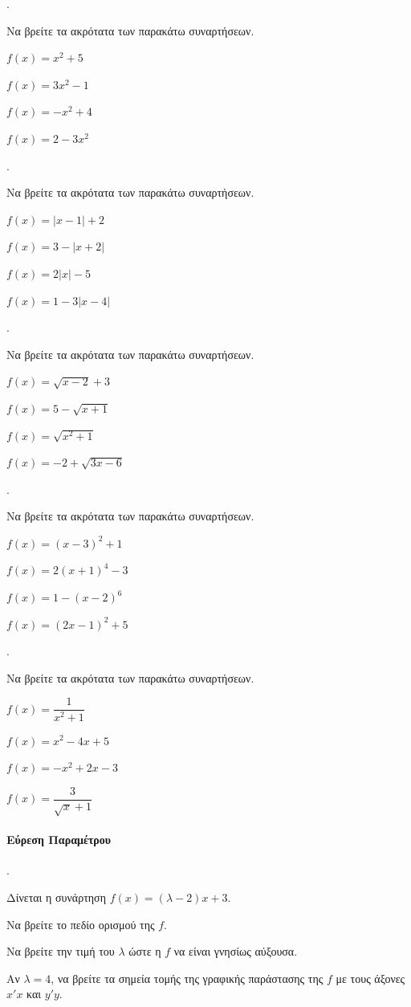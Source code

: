 \documentclass[11pt,a4paper,twocolumn]{article}
\newcounter{askhsh}
\newcommand{\askhsh}{\large\theaskhsh.\ \addtocounter{askhsh}{1}}
\begin{document}
\askhsh Να βρείτε τα ακρότατα των παρακάτω συναρτήσεων.
\begin{alist}
    \item $f(x)=x^2+5$
    \item $f(x)=3x^2-1$
    \item $f(x)=-x^2+4$
    \item $f(x)=2-3x^2$
\end{alist}
\askhsh Να βρείτε τα ακρότατα των παρακάτω συναρτήσεων.
\begin{alist}
    \item $f(x)=|x-1|+2$
    \item $f(x)=3-|x+2|$
    \item $f(x)=2|x|-5$
    \item $f(x)=1-3|x-4|$
\end{alist}
\askhsh Να βρείτε τα ακρότατα των παρακάτω συναρτήσεων.
\begin{alist}
    \item $f(x)=\sqrt{x-2}+3$
    \item $f(x)=5-\sqrt{x+1}$
    \item $f(x)=\sqrt{x^2+1}$
    \item $f(x)=-2+\sqrt{3x-6}$
\end{alist}
\askhsh Να βρείτε τα ακρότατα των παρακάτω συναρτήσεων.
\begin{alist}
    \item $f(x)=(x-3)^2+1$
    \item $f(x)=2(x+1)^4-3$
    \item $f(x)=1-(x-2)^6$
    \item $f(x)=(2x-1)^2+5$
\end{alist}
\askhsh Να βρείτε τα ακρότατα των παρακάτω συναρτήσεων.
\begin{alist}
    \item $f(x)=\dfrac{1}{x^2+1}$
    \item $f(x)=x^2-4x+5$
    \item $f(x)=-x^2+2x-3$
    \item $f(x)=\dfrac{3}{\sqrt{x}+1}$
\end{alist}
\paragraph{Εύρεση Παραμέτρου}
\askhsh Δίνεται η συνάρτηση $f(x)=(\lambda-2)x+3$.
\begin{alist}
    \item Να βρείτε το πεδίο ορισμού της $f$.
    \item Να βρείτε την τιμή του $\lambda$ ώστε η $f$ να είναι γνησίως αύξουσα.
    \item Αν $\lambda=4$, να βρείτε τα σημεία τομής της γραφικής παράστασης της $f$ με τους άξονες $x'x$ και $y'y$.
\end{alist}
\end{document}
